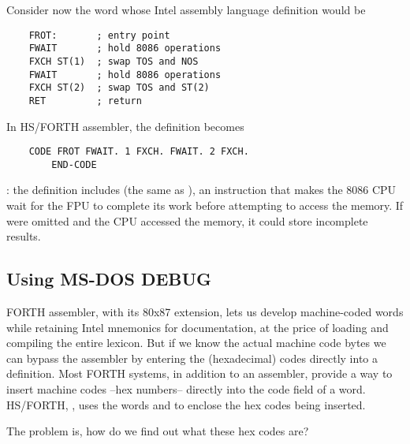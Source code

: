 Consider now the word  whose Intel assembly language definition would be

\begin{lstlisting}
    FROT:       ; entry point
    FWAIT       ; hold 8086 operations
    FXCH ST(1)  ; swap TOS and NOS
    FWAIT       ; hold 8086 operations
    FXCH ST(2)  ; swap TOS and ST(2)
    RET         ; return
\end{lstlisting}

In HS/FORTH assembler, the definition becomes

\begin{lstlisting}
    CODE FROT FWAIT. 1 FXCH. FWAIT. 2 FXCH.
        END-CODE
\end{lstlisting}

\leftbar[1\linewidth]
\Note: the definition includes  (the same as ), an instruction that makes the 8086 CPU wait for the FPU to complete its work before attempting to access the memory. If  were omitted and the CPU accessed the memory, it could store incomplete results\footnotemark.
\endleftbar
{}

\subsection{Using MS-DOS DEBUG}

FORTH assembler, with its 80x87 extension, lets us develop machine-coded words while retaining Intel mnemonics for documentation, at the price of loading and compiling the entire  lexicon. But if we know the actual machine code bytes we can bypass the assembler by entering the (hexadecimal) codes directly into a  definition. Most FORTH systems, in addition to an assembler, provide a way to insert machine codes --hex numbers-- directly into the code field of a word. HS/FORTH, \eg, uses the words \bc{<\%} and \bc{\%>} to enclose the hex codes being inserted.

The problem is, how do we find out what these hex codes are?

